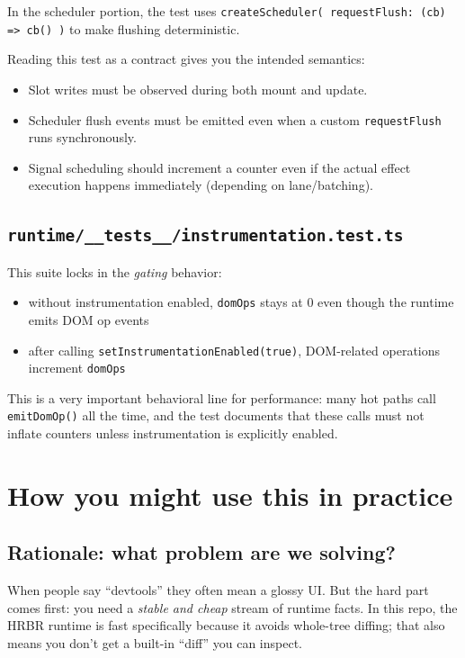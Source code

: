 In the scheduler portion, the test uses \texttt{createScheduler({ requestFlush: (cb) => cb() })} to make flushing deterministic.

Reading this test as a contract gives you the intended semantics:

\begin{itemize}
\item Slot writes must be observed during both mount and update.
\item Scheduler flush events must be emitted even when a custom \texttt{requestFlush} runs synchronously.
\item Signal scheduling should increment a counter even if the actual effect execution happens immediately (depending on lane/batching).
\end{itemize}

\subsection{\texttt{runtime/\_\_tests\_\_/instrumentation.test.ts}}

This suite locks in the \emph{gating} behavior:

\begin{itemize}
\item without instrumentation enabled, \texttt{domOps} stays at 0 even though the runtime emits DOM op events
\item after calling \texttt{setInstrumentationEnabled(true)}, DOM-related operations increment \texttt{domOps}
\end{itemize}

This is a very important behavioral line for performance: many hot paths call \texttt{emitDomOp()} all the time, and the test documents that these calls must not inflate counters unless instrumentation is explicitly enabled.

\section{How you might use this in practice}

\subsection{Rationale: what problem are we solving?}

When people say ``devtools'' they often mean a glossy UI.
But the hard part comes first: you need a \emph{stable and cheap} stream of runtime facts.
In this repo, the HRBR runtime is fast specifically because it avoids whole-tree diffing; that also means you don't get a built-in ``diff'' you can inspect.

